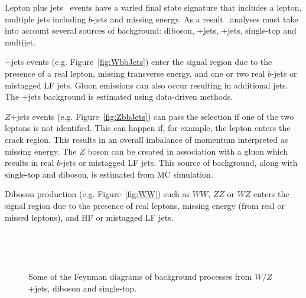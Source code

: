 Lepton plus jets \ttbar\ events have a varied final state signature that includes a lepton, multiple jets including $b$-jets and missing energy. As a result \ttbar\ analyses must take into account several sources of background: diboson, \W+jets, \Z+jets, single-top and multijet.

\W+jets events (e.g. Figure~\ref{fig:WbbJets}) enter the signal region due to the presence of a real lepton, missing transverse energy, and one or two real $b$-jets or mistagged LF jets. Gluon emissions can also occur resulting in additional jets. The \W+jets background is estimated using data-driven methods.

$Z$+jets events (e.g. Figure~\ref{fig:ZbbJets}) can pass the selection if one of the two leptons is not identified. This can happen if, for example, the lepton enters the crack region. This results in an overall imbalance of momentum interpreted as missing energy. The $Z$ boson can be created in association with a gluon which results in real $b$-jets or mistagged LF jets. This source of background, along with single-top and diboson, is estimated from MC simulation.

Diboson production (e.g. Figure~\ref{fig:WW}) such as $WW$, $ZZ$ or $WZ$ enters the signal region due to the presence of real leptons, missing energy (from real or missed leptons), and HF or mistagged LF jets.

\begin{figure}[htbp]
  \centering
    \begin{minipage}[][][t]{.45\textwidth}
      \centering
        
      \label{fig:WbbJets}
    \end{minipage}
    \,
    \begin{minipage}[][][t]{.45\textwidth}
      \centering
        
      \label{fig:ZbbJets}
    \end{minipage}
    
    \begin{minipage}[][][t]{.45\textwidth}
      \centering
        
      \label{fig:WW}
    \end{minipage}
    \,
    \begin{minipage}[][][t]{.45\textwidth}
      \centering
        
      \label{fig:SingleTop}
    \end{minipage}
    \caption{Some of the Feynman diagrams of background processes from $W/Z$+jets, diboson and single-top.}
  \label{fig:CrossSectionWJetsFeynman}
\end{figure}


